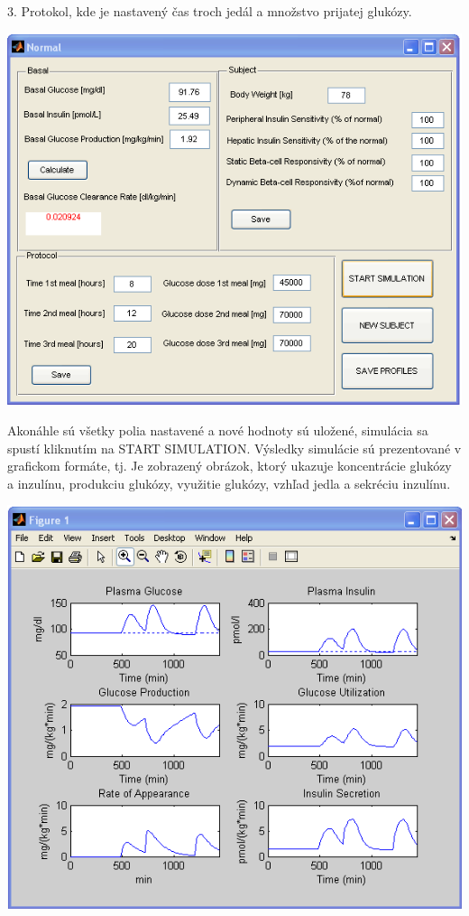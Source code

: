 3. Protokol, kde je nastavený čas troch jedál a množstvo prijatej glukózy. 

\includegraphics[scale=0.5]{ob-2.PNG}

Akonáhle sú všetky polia nastavené a nové hodnoty sú uložené, simulácia sa spustí kliknutím na START SIMULATION. Výsledky simulácie sú prezentované v grafickom formáte, tj. Je zobrazený obrázok, ktorý ukazuje koncentrácie glukózy a inzulínu, produkciu glukózy, využitie glukózy, vzhľad jedla a sekréciu inzulínu.

\includegraphics[scale=0.5]{ob-3.PNG}

